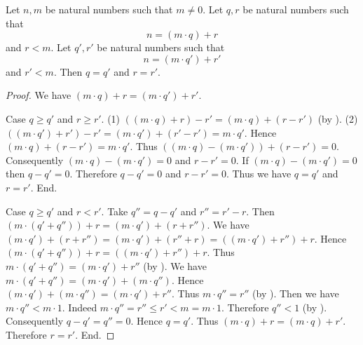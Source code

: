 \documentclass{article}
\begin{document}
  \begin{forthel}
    \begin{theorem}[title=Euclid's Division Theorem: Uniqueness,id=euclid_uniqueness]
      Let $n, m$ be natural numbers such that $m \neq 0$.
      Let $q, r$ be natural numbers such that
      \[n = (m \cdot q) + r\]
      and $r < m$.
      Let $q', r'$ be natural numbers such that
      \[n = (m \cdot q') + r'\]
      and $r' < m$.
      Then $q = q'$ and $r = r'$.
    \end{theorem}
    \begin{proof}
      We have $(m \cdot q) + r = (m \cdot q') + r'$.

      Case $q \geq q'$ and $r \geq r'$.
        (1) $((m \cdot q) + r) - r' = (m \cdot q) + (r - r')$ (by ).
        (2) $((m \cdot q') + r') - r'
          = (m \cdot q') + (r' - r')
          = m \cdot q'$.
        Hence $(m \cdot q) + (r - r') = m \cdot q'$.
        Thus $((m \cdot q) - (m \cdot q')) + (r - r') = 0$.
        Consequently $(m \cdot q) - (m \cdot q') = 0$ and $r - r' = 0$.
        If $(m \cdot q) - (m \cdot q') = 0$ then $q - q' = 0$.
        Therefore $q - q' = 0$ and $r - r' = 0$.
        Thus we have $q = q'$ and $r = r'$.
      End.

      Case $q \geq q'$ and $r < r'$.
        Take $q'' = q - q'$ and $r'' = r' - r$.
        Then $(m \cdot (q' + q'')) + r = (m \cdot q') + (r + r'')$.
        We have $(m \cdot q') + (r + r'')
          = (m \cdot q') + (r'' + r)
          = ((m \cdot q') + r'') + r$.
        Hence $(m \cdot (q' + q'')) + r = ((m \cdot q') + r'') + r$.
        Thus $m \cdot (q' + q'') = (m \cdot q') + r''$ (by ).
        We have $m \cdot (q' + q'') = (m \cdot q') + (m \cdot q'')$.
        Hence $(m \cdot q') + (m \cdot q'') = (m \cdot q') + r''$.
        Thus $m \cdot q'' = r''$ (by ).
        Then we have $m \cdot q'' < m \cdot 1$.
        Indeed $m \cdot q''
          = r''
          \leq r'
          < m
          = m \cdot 1$.
        Therefore $q'' < 1$ (by ).
        Consequently $q - q' = q'' = 0$.
        Hence $q = q'$.
        Thus $(m \cdot q) + r = (m \cdot q) + r'$.
        Therefore $r = r'$.
      End.


\end{proof}
\end{forthel}
\end{document}
